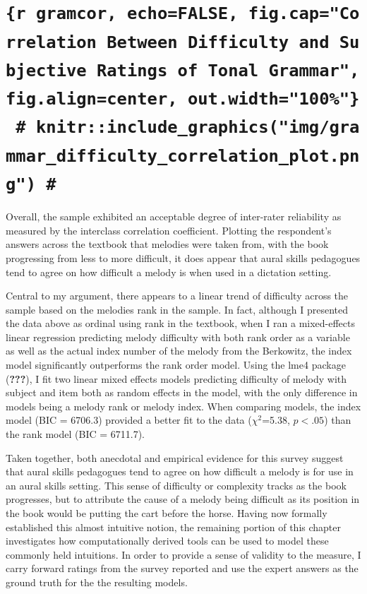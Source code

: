 \documentclass[english,man,floatsintext]{apa6}
\begin{document}
\hypertarget{r-gramcor-echofalse-fig.capcorrelation-between-difficulty-and-subjective-ratings-of-tonal-grammarfig.aligncenter-out.width100-knitrinclude_graphicsimggrammar_difficulty_correlation_plot.png}{%
\section{\texorpdfstring{\texttt{\{r\ gramcor,\ echo=FALSE,\ fig.cap="Correlation\ Between\ Difficulty\ and\ Subjective\ Ratings\ of\ Tonal\ Grammar",fig.align=\textquotesingle{}center\textquotesingle{},\ out.width="100\%"\}\ \#\ knitr::include\_graphics("img/grammar\_difficulty\_correlation\_plot.png")\ \#}}{\{r gramcor, echo=FALSE, fig.cap="Correlation Between Difficulty and Subjective Ratings of Tonal Grammar",fig.align='center', out.width="100\%"\} \# knitr::include\_graphics("img/grammar\_difficulty\_correlation\_plot.png") \#}}\label{r-gramcor-echofalse-fig.capcorrelation-between-difficulty-and-subjective-ratings-of-tonal-grammarfig.aligncenter-out.width100-knitrinclude_graphicsimggrammar_difficulty_correlation_plot.png}}

Overall, the sample exhibited an acceptable degree of inter-rater reliability as measured by the interclass correlation coefficient.
Plotting the respondent's answers across the textbook that melodies were taken from, with the book progressing from less to more difficult, it does appear that aural skills pedagogues tend to agree on how difficult a melody is when used in a dictation setting.

Central to my argument, there appears to a linear trend of difficulty across the sample based on the melodies rank in the sample.
In fact, although I presented the data above as ordinal using rank in the textbook, when I ran a mixed-effects linear regression predicting melody difficulty with both rank order as a variable as well as the actual index number of the melody from the Berkowitz, the index model significantly outperforms the rank order model.
Using the lme4 package ({\textbf{???}}), I fit two linear mixed effects models predicting difficulty of melody with subject and item both as random effects in the model, with the only difference in models being a melody rank or melody index.
When comparing models, the index model (BIC = 6706.3) provided a better fit to the data (\(\chi^2\)=5.38, \(p<.05\)) than the rank model (BIC = 6711.7).

Taken together, both anecdotal and empirical evidence for this survey suggest that aural skills pedagogues tend to agree on how difficult a melody is for use in an aural skills setting.
This sense of difficulty or complexity tracks as the book progresses, but to attribute the cause of a melody being difficult as its position in the book would be putting the cart before the horse.
Having now formally established this almost intuitive notion, the remaining portion of this chapter investigates how computationally derived tools can be used to model these commonly held intuitions.
In order to provide a sense of validity to the measure, I carry forward ratings from the survey reported and use the expert answers as the ground truth for the the resulting models.
\end{document}
